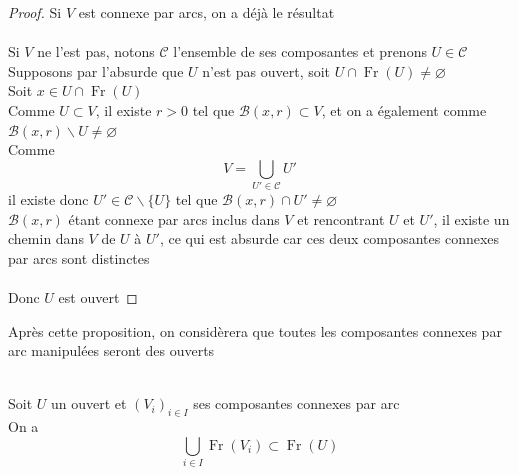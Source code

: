 \documentclass{article}
\begin{document}
\begin{flushleft}
\begin{proof}
    Si $V$ est connexe par arcs, on a déjà le résultat
    \\~\\
    Si $V$ ne l'est pas, notons $\mathcal{C}$ l'ensemble de ses composantes et prenons $U \in \mathcal{C}$\\
    Supposons par l'absurde que $U$ n'est pas ouvert, soit $U \cap \operatorname{Fr}(U) \neq \varnothing$\\
    Soit $x \in U \cap \operatorname{Fr}(U)$\\
    Comme $U \subset V$, il existe $r > 0$ tel que $\mathcal{B}(x, r) \subset V$, et on a également comme
    $\mathcal{B}(x, r) \backslash U \neq \varnothing$\\
    Comme
    \[ V = \bigcup_{U' \in \mathcal{C}} U' \]
    il existe donc $U' \in \mathcal{C} \backslash \{U \}$ tel que $\mathcal{B}(x, r) \cap U' \neq \varnothing$\\
    $\mathcal{B}(x, r)$ étant connexe par arcs inclus dans $V$ et rencontrant $U$ et $U'$, il existe un chemin dans
    $V$ de $U$ à $U'$, ce qui est absurde car ces deux composantes connexes par arcs sont distinctes
    \\~\\
    Donc $U$ est ouvert
\end{proof}
\vspace*{0.5cm}

Après cette proposition, on considèrera que toutes les composantes connexes par arc manipulées seront des ouverts
\\~\\
\begin{tcolorbox}[colback = purple!20!white, colframe = purple!60!white, title = Proposition 3]
    Soit $U$ un ouvert et $(V_i)_{i \in I}$ ses composantes connexes par arc\\
    On a
    \[ \bigcup_{i \in I} \operatorname{Fr}(V_i) \subset \operatorname{Fr}(U) \]
\end{tcolorbox}


\end{flushleft}
\end{document}
